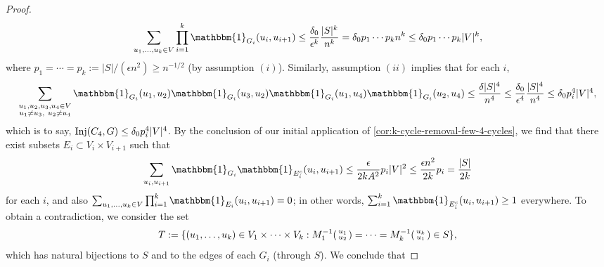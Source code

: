 \documentclass[reqno,11pt]{amsart}
\theoremstyle{definition}
\theoremstyle{remark}
\numberwithin{equation}{section}
\newcommand{\Z}{\mathbf{Z}}
\newcommand{\one}{\mathbbm{1}}
\newcommand{\Inj}{\textnormal{Inj}}
\newenvironment{psmall}
  {\left(\begin{smallmatrix}}
  {\end{smallmatrix}\right)}
\begin{document}
\begin{proof}
\[
    \sum_{u_1, \ldots, u_k \in V} 
    \prod_{i=1}^k \one_{G_i}(u_i, u_{i+1}) \le 
    \frac{\delta_0}{\epsilon^k} \frac{|S|^k}{n^k}
    =
    \delta_0 p_1 \cdots p_k n^k
    \le \delta_0 p_1 \cdots p_k |V|^k,
\]
where $p_1 = \cdots = p_k := |S|/(\epsilon n^2) \ge n^{-1/2}$ (by assumption $(i)$). Similarly, assumption $(ii)$ implies that for each $i$,
\[
    \sum_{\substack{u_1, u_2, u_3, u_4 \in V \\ u_1 \neq u_3,\ u_2 \neq u_4}} \one_{G_i}(u_1, u_2) \one_{G_i}(u_3, u_2) \one_{G_i}(u_1, u_4) \one_{G_i}(u_2, u_4) 
    \le \frac{\delta|S|^4}{n^4} \le \frac{\delta_0}{\epsilon^4} \frac{|S|^4}{n^4}
    \le \delta_0 p_i^4 |V|^4,
\]
which is to say, $\Inj(C_4, G) \le \delta_0 p_i^4 |V|^4$. By the conclusion of our initial application of \cref{cor:k-cycle-removal-few-4-cycles}, we find that there exist subsets $E_i \subset V_i \times V_{i+1}$ such that
\[
    \sum_{u_i, u_{i+1}} \one_{G_i} \one_{E_i^c} (u_i, u_{i+1})
    \le 
    \frac{\epsilon}{2kA^2} p_i |V|^2
    \le 
    \frac{\epsilon n^2}{2k} p_i
    =
    \frac{|S|}{2k}
\]
for each $i$, and also $\sum_{u_1, \ldots, u_k \in V} \prod_{i=1}^k \one_{E_i}(u_i, u_{i+1}) = 0$; in other words, $\sum_{i=1}^k \one_{E_i^c}(u_i, u_{i+1}) \ge 1$ everywhere. To obtain a contradiction, we consider the set
\[
    T := \{(u_1, \ldots, u_k) \in V_1 \times \cdots \times V_k : M_1^{-1}\begin{psmall} u_1 \\ u_2 \end{psmall} = \cdots = M_k^{-1}\begin{psmall} u_k \\ u_1 \end{psmall} \in S \},
\]
which has natural bijections to $S$ and to the edges of each $G_i$ (through $S$). We conclude that

\end{proof}
\end{document}

